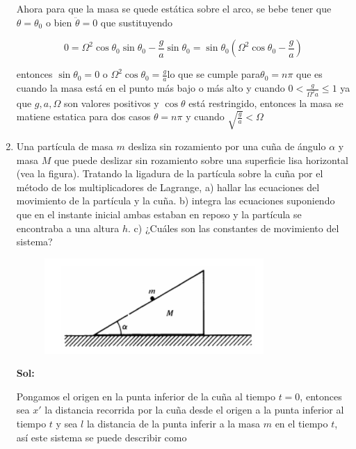 \documentclass[12pt,a4paper]{article}
\begin{document}
\begin{enumerate}
        
        Ahora para que la masa se quede estática sobre el arco, se bebe tener que $\theta = \theta_0$ o bien $\ddot{\theta} = 0$ que sustituyendo
        
        \begin{equation*}
             0 = \Omega^2 \cos{\theta_0}\sin{\theta_0} - \frac{g}{a} \sin{\theta_0} = \sin{\theta_0} (\Omega^2 \cos{\theta_0} - \frac{g}{a})
        \end{equation*}
        
        entonces $\sin{\theta_0} = 0$ o $\Omega^2 \cos{\theta_0} = \frac{g}{a}$lo que se cumple para$\theta_0  = n\pi$  que es cuando la masa está en el punto más bajo o más alto y cuando $0<\frac{g}{\Omega^2 a} \leq 1$ ya que $g,a,\Omega$ son valores positivos y $\cos{\theta}$ está restringido, entonces la masa se matiene estatica para dos casos $\theta = n\pi$ y cuando $\sqrt{\frac{g}{a}} < \Omega$
        
        
        
        
        
        
        \item Una partícula de masa $m$ desliza sin rozamiento por una cuña de ángulo $\alpha$ y masa $M$ que puede deslizar sin rozamiento sobre una superficie lisa horizontal (vea la figura). Tratando la ligadura de la partícula sobre la cuña por el método de los multiplicadores de Lagrange, a) hallar las ecuaciones del movimiento de la partícula y la cuña. b) integra las ecuaciones suponiendo que en el instante inicial ambas estaban en reposo y la partícula se encontraba a una altura $h$. c) ¿Cuáles son las constantes de movimiento del sistema?
        
        \begin{figure}[h!]
            \centering
            \includegraphics{4.PNG}
        \end{figure}
        
        \textbf{Sol:}
        
        Pongamos el origen en la punta inferior de la cuña al tiempo $t = 0$, entonces sea  $x'$ la distancia recorrida por la cuña desde el origen a la punta inferior al tiempo $t$ y sea $l$ la distancia de la punta inferir a la masa $m$ en el tiempo $t$, así este sistema se puede describir como
        

\end{enumerate}
\end{document}
